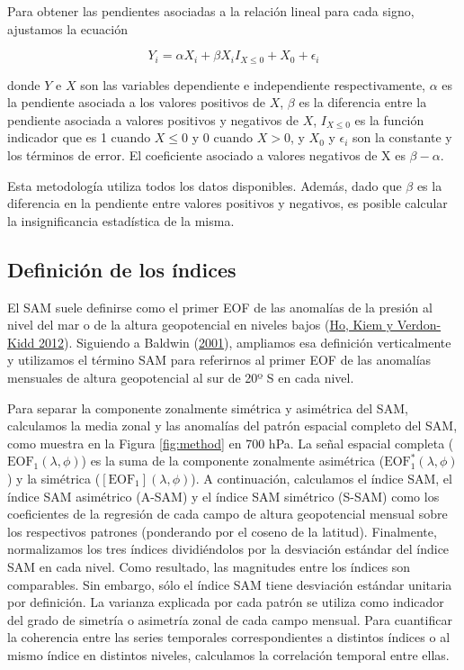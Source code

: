 \documentclass[12pt,oneside,a4paper]{reedthesis}
\begin{document}
Para obtener las pendientes asociadas a la relación lineal para cada signo, ajustamos la ecuación

\[
Y_i = \alpha X_i + \beta X_iI_{X\le 0} + X_0 + \epsilon_i
\]

donde \(Y\) e \(X\) son las variables dependiente e independiente respectivamente, \(\alpha\) es la pendiente asociada a los valores positivos de \(X\), \(\beta\) es la diferencia entre la pendiente asociada a valores positivos y negativos de \(X\), \(I_{X\le 0}\) es la función indicador que es 1 cuando \(X\le0\) y 0 cuando \(X>0\), y \(X_0\) y \(\epsilon_i\) son la constante y los términos de error.
El coeficiente asociado a valores negativos de X es \(\beta - \alpha\).

Esta metodología utiliza todos los datos disponibles.
Además, dado que \(\beta\) es la diferencia en la pendiente entre valores positivos y negativos, es posible calcular la insignificancia estadística de la misma.

\hypertarget{definition-of-indices}{%
\subsection{Definición de los índices}\label{definition-of-indices}}

El SAM suele definirse como el primer EOF de las anomalías de la presión al nivel del mar o de la altura geopotencial en niveles bajos (\protect\hyperlink{ref-ho2012}{Ho, Kiem y Verdon-Kidd 2012}).
Siguiendo a Baldwin (\protect\hyperlink{ref-baldwin2001}{2001}), ampliamos esa definición verticalmente y utilizamos el término SAM para referirnos al primer EOF de las anomalías mensuales de altura geopotencial al sur de 20º S en cada nivel.

Para separar la componente zonalmente simétrica y asimétrica del SAM, calculamos la media zonal y las anomalías del patrón espacial completo del SAM, como muestra en la Figura \ref{fig:method} en 700 hPa.
La señal espacial completa (\(\mathrm{EOF_1}(\lambda, \phi)\)) es la suma de la componente zonalmente asimétrica (\(\mathrm{EOF_1^*}(\lambda, \phi)\)) y la simétrica (\([\mathrm{EOF_1}](\lambda, \phi)\)).
A continuación, calculamos el índice SAM, el índice SAM asimétrico (A-SAM) y el índice SAM simétrico (S-SAM) como los coeficientes de la regresión de cada campo de altura geopotencial mensual sobre los respectivos patrones (ponderando por el coseno de la latitud).
Finalmente, normalizamos los tres índices dividiéndolos por la desviación estándar del índice SAM en cada nivel.
Como resultado, las magnitudes entre los índices son comparables.
Sin embargo, sólo el índice SAM tiene desviación estándar unitaria por definición.
La varianza explicada por cada patrón se utiliza como indicador del grado de simetría o asimetría zonal de cada campo mensual.
Para cuantificar la coherencia entre las series temporales correspondientes a distintos índices o al mismo índice en distintos niveles, calculamos la correlación temporal entre ellas.
\end{document}
